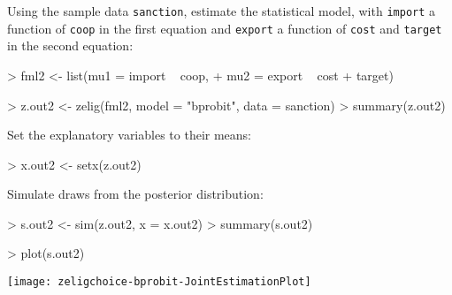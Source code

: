 \documentclass{article}
\begin{document}
\begin{enumerate}
Using the sample data \texttt{sanction}, estimate the statistical model, 
with {\tt import} a function of {\tt coop} in the first equation and 
{\tt export} a function of {\tt cost} and {\tt target} in the second equation:
\begin{Schunk}
\begin{Sinput}
>  fml2 <- list(mu1 = import ~ coop, 
+                mu2 = export ~ cost + target)
\end{Sinput}
\end{Schunk}
\begin{Schunk}
\begin{Sinput}
>  z.out2 <- zelig(fml2, model = "bprobit", data = sanction)
>  summary(z.out2)
\end{Sinput}
\end{Schunk}
Set the explanatory variables to their means:
\begin{Schunk}
\begin{Sinput}
>  x.out2 <- setx(z.out2)
\end{Sinput}
\end{Schunk}
Simulate draws from the posterior distribution:
\begin{Schunk}
\begin{Sinput}
>  s.out2 <- sim(z.out2, x = x.out2)
>  summary(s.out2)
\end{Sinput}
\end{Schunk}
\begin{center}
\begin{Schunk}
\begin{Sinput}
>  plot(s.out2)
\end{Sinput}
\end{Schunk}
\texttt{[image: zeligchoice-bprobit-JointEstimationPlot]}
\end{center}


%   
% 


\end{enumerate}
\end{document}
